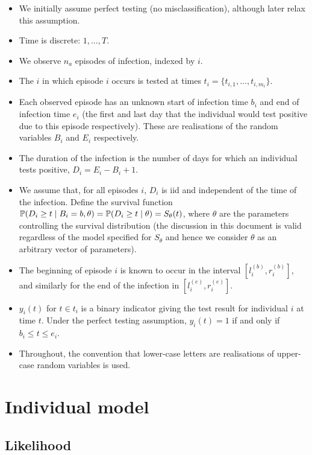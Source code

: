 \documentclass[main.tex]{subfiles}
\begin{document}
\begin{itemize}
\item
  We initially assume perfect testing (no misclassification), although
  later relax this assumption.
\item
  Time is discrete: $1, \dots, T$.
\item
  We observe $n_a$ episodes of infection, indexed by $i$.
\item
  The $i$ in which episode $i$ occurs is tested at times
  $t_i = \{ t_{i,1}, \dots, t_{i,m_i} \}$.
\item
  Each observed episode has an unknown start of infection time $b_i$
  and end of infection time $e_i$ (the first and last day that the
  individual would test positive due to this episode respectively).
  These are realisations of the random variables $B_i$ and $E_i$
  respectively.
\item
  The duration of the infection is the number of days for which an
  individual tests positive, $D_i = E_i - B_i + 1$.
\item
  We assume that, for all episodes $i$, $D_i$ is iid and independent
  of the time of the infection. Define the survival function
  $\operatorname{\mathbb{P}}(D_i \geq t \mid B_i = b, \theta) = \operatorname{\mathbb{P}}(D_i \geq t \mid \theta) = S_\theta(t)$,
  where $\theta$ are the parameters controlling the survival
  distribution (the discussion in this document is valid regardless of
  the model specified for $S_\theta$ and hence we consider $\theta$
  as an arbitrary vector of parameters).
\item
  The beginning of episode $i$ is known to occur in the interval
  $[l_i^{(b)}, r_i^{(b)}]$, and similarly for the end of the infection
  in $[l_i^{(e)}, r_i^{(e)}]$.
\item
  $y_i(t)$ for $t \in t_i$ is a binary indicator giving the test
  result for individual $i$ at time $t$. Under the perfect testing
  assumption, $y_i(t) = 1$ if and only if $b_i \leq t \leq e_i$.
\item
  Throughout, the convention that lower-case letters are realisations of
  upper-case random variables is used.
\end{itemize}


\section{Individual model}\label{individual-model}

\subsection{Likelihood}\label{likelihood}
\end{document}
